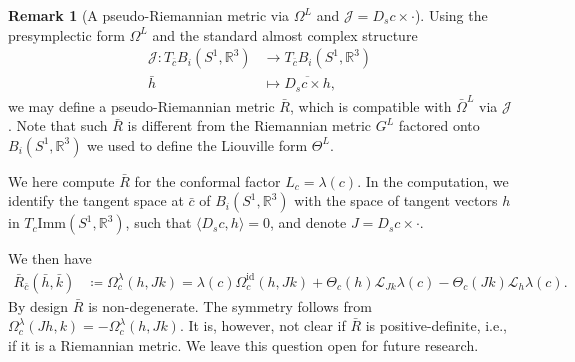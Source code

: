\documentclass[12pt]{amsart}
\newcommand{\AuthorCOMMENT}[3]{\textcolor{#2}{{[\textbf{#1:} \textsl{#3}}]}}  %
\newcommand{\Sadashige}[1]{\AuthorCOMMENT{Sadashige}{violet}{#1}}
\newcommand{\rev}[1]{#1}
\theoremstyle{definition}
\newtheorem{remark}[theorem]{Remark}
\newcommand{\R}{\mathbb R}
\newcommand{\id}{\mathrm{id}}
\newcommand{\Imm}{\mathrm{Imm}}
\def\la{\lambda}
\def\Th{\Theta}
\def\Ph{\Phi}
\def\Om{\Omega}
\def\x{\times}
\def\L{\mathcal{L}}
\def\J{\mathcal{J}}
\def\R{{\mathbb R}}
\begin{document}
\begin{remark}[A pseudo-Riemannian metric via $\Om^L$ and $\J=D_s c \x \cdot$]
Using the presymplectic form $\Om^L$ and the \rev{standard} almost complex structure
\begin{align*}
    \J \colon T_{\rev{\bar c}}B_i(S^1,\R^3) &\to T_{\rev{\bar c}} B_i(S^1,\R^3)\\
    \rev{\bar h} &\mapsto \rev{\overline{D_s c \times h}},
\end{align*}
we may define a pseudo-Riemannian metric $\rev{\bar R}$, \rev{which} is compatible with $\bar\Om^L$ \rev{via $\J$}. Note that such \rev{$\bar R$} is different from the Riemannian metric $G^L$ \rev{factored onto $B_i(S^1,\R^3)$} we used to define the Liouville form $\Th^L$.

We here compute \rev{$\bar R$} for the conformal factor $L_c=\la(c)$. In the computation, we identify the tangent space at $\rev{\bar c}$ of $B_i(S^1,\mathbb R^3)$ with the space of tangent vectors $h$ in $T_c\Imm(S^1,\mathbb R^3)$, 
such that $\langle D_sc,h\rangle=0$, \rev{and denote $J=D_s c\times \cdot$}.

We then have
\begin{align*}
\rev{\bar  R_{\bar c}}(\rev{\bar h,\bar k})&
\coloneqq \Om^{\la}_c(h,\rev{J} k)
=\la(c)\Omega_c^{\operatorname{id}}(h,\rev{J} k)
+\Th_c(h) \L_{\rev{J} k} \la(c)-\Th_c(\rev{J} k) \L_h \la(c).
\end{align*}
By design $\rev{\bar R}$ is non-degenerate. The symmetry follows from $\Om_c^\la(\rev{J} h,k)=-\Om_c^\la(h,\rev{J} k)$. It is, however, not clear if \rev{$\bar R$}  is positive-definite, i.e., if it is a Riemannian metric. We leave this question open for future research. 
\end{remark}
\end{document}
